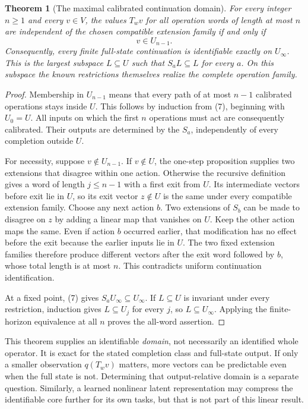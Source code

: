 \documentclass[11pt,letterpaper]{article}
\theoremstyle{plain}
\newtheorem{theorem}{Theorem}[section]
\theoremstyle{definition}
\begin{document}
\begin{theorem}[The maximal calibrated continuation domain]\label{thm:core}
For every integer $n\ge1$ and every $v\in V$, the values $T_wv$ for all operation words of length at most $n$ are independent of the chosen compatible extension family if and only if
\[
v\in U_{n-1}.
\]
Consequently, every finite full-state continuation is identifiable exactly on $U_\infty$. This is the largest subspace $L\subseteq U$ such that $S_aL\subseteq L$ for every $a$. On this subspace the known restrictions themselves realize the complete operation family.
\end{theorem}
\begin{proof}
Membership in $U_{n-1}$ means that every path of at most $n-1$ calibrated operations stays inside $U$. This follows by induction from (7), beginning with $U_0=U$. All inputs on which the first $n$ operations must act are consequently calibrated. Their outputs are determined by the $S_a$, independently of every completion outside $U$.

For necessity, suppose $v\notin U_{n-1}$. If $v\notin U$, the one-step proposition supplies two extensions that disagree within one action. Otherwise the recursive definition gives a word of length $j\le n-1$ with a first exit from $U$. Its intermediate vectors before exit lie in $U$, so its exit vector $z\notin U$ is the same under every compatible extension family. Choose any next action $b$. Two extensions of $S_b$ can be made to disagree on $z$ by adding a linear map that vanishes on $U$. Keep the other action maps the same. Even if action $b$ occurred earlier, that modification has no effect before the exit because the earlier inputs lie in $U$. The two fixed extension families therefore produce different vectors after the exit word followed by $b$, whose total length is at most $n$. This contradicts uniform continuation identification.

At a fixed point, (7) gives $S_aU_\infty\subseteq U_\infty$. If $L\subseteq U$ is invariant under every restriction, induction gives $L\subseteq U_j$ for every $j$, so $L\subseteq U_\infty$. Applying the finite-horizon equivalence at all $n$ proves the all-word assertion.
\end{proof}

This theorem supplies an identifiable \emph{domain}, not necessarily an identified whole operator. It is exact for the stated completion class and full-state output. If only a smaller observation $q(T_wv)$ matters, more vectors can be predictable even when the full state is not. Determining that output-relative domain is a separate question. Similarly, a learned nonlinear latent representation may compress the identifiable core further for its own tasks, but that is not part of this linear result.
\end{document}
